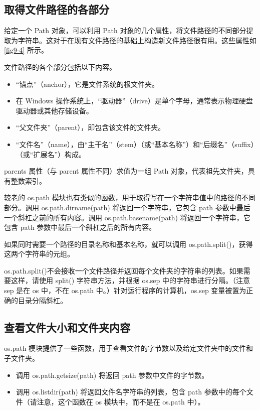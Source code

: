 \subsection{取得文件路径的各部分}
给定一个 Path 对象，可以利用 Path 对象的几个属性，将文件路径的不同部分提取为字符串。这对于在现有文件路径的基础上构造新文件路径很有用。这些属性如 \autoref{fig9-4} 所示。

文件路径的各个部分包括以下内容。
\begin{itemize}
    \item “锚点”（anchor），它是文件系统的根文件夹。
    \item 在 Windows 操作系统上，“驱动器”（drive）是单个字母，通常表示物理硬盘驱动器或其他存储设备。
    \item “父文件夹”（parent），即包含该文件的文件夹。
    \item “文件名”（name），由“主干名”（stem）（或“基本名称”）和“后缀名”（suffix）（或“扩展名”）构成。
\end{itemize}

parents 属性（与 parent 属性不同）求值为一组 Path 对象，代表祖先文件夹，具有整数索引。

较老的 os.path 模块也有类似的函数，用于取得写在一个字符串值中的路径的不同部分。调用 os.path.dirname(path) 将返回一个字符串，它包含 path 参数中最后一个斜杠之前的所有内容。调用 os.path.basename(path) 将返回一个字符串，它包含 path 参数中最后一个斜杠之后的所有内容。

如果同时需要一个路径的目录名称和基本名称，就可以调用 os.path.split()，获得这两个字符串的元组。

os.path.split()不会接收一个文件路径并返回每个文件夹的字符串的列表。如果需要这样，请使用 split() 字符串方法，并根据 os.sep 中的字符串进行分隔。（注意 sep 是在 os 中，不在 os.path 中。）针对运行程序的计算机，os.sep 变量被置为正确的目录分隔斜杠。

\subsection{查看文件大小和文件夹内容}
os.path 模块提供了一些函数，用于查看文件的字节数以及给定文件夹中的文件和子文件夹。
\begin{itemize}
    \item 调用 os.path.getsize(path) 将返回 path 参数中文件的字节数。
    \item 调用 os.listdir(path) 将返回文件名字符串的列表，包含 path 参数中的每个文件（请注意，这个函数在 os 模块中，而不是在 os.path 中）。
\end{itemize}
